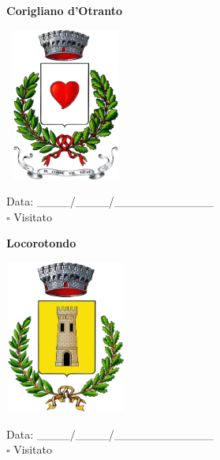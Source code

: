 \documentclass[a5paper,12pt]{article}
\begin{document}
\newpage

\noindent
\begin{minipage}[t]{0.45\textwidth}
    \begin{center}
        \textbf{Corigliano d'Otranto}
    \end{center}
    \vspace{-0.5cm} %
    \begin{center}
        \includegraphics[height= 5cm, width=4cm]{Puglia/Stemma Corigliano d'Otranto.png}
    \end{center}
    \vspace{-0.4cm} %
    \begin{flushleft}
        Data: \_\_\_\_/\_\_\_\_/\_\_\_\_\_\_\_\_\_\_\_\_ \\
        $\square$ Visitato
    \end{flushleft}
\end{minipage}
\hfill
\noindent
\begin{minipage}[t]{0.45\textwidth}
    \begin{center}
        \textbf{Locorotondo}
    \end{center}
    \vspace{-0.5cm} %
    \begin{center}
        \includegraphics[height= 5cm, width=4cm]{Puglia/Stemma Locorotondo.png}
    \end{center}
    \vspace{-0.4cm} %
    \begin{flushleft}
        Data: \_\_\_\_/\_\_\_\_/\_\_\_\_\_\_\_\_\_\_\_\_ \\
        $\square$ Visitato
    \end{flushleft}
\end{minipage}
\end{document}
